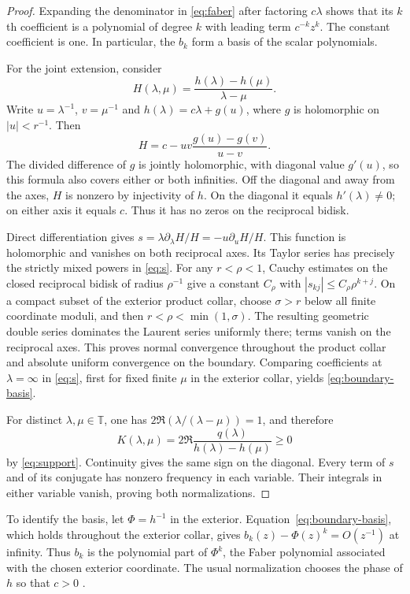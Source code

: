\documentclass[11pt]{article}
\newcommand{\T}{\mathbb T}
\theoremstyle{remark}\newtheorem{remark}[theorem]{Remark}
\numberwithin{equation}{section}
\begin{document}
\begin{proof}
Expanding the denominator in \eqref{eq:faber} after factoring $c\lambda$ shows that its $k$th coefficient is a polynomial of degree $k$ with leading term $c^{-k}z^k$. The constant coefficient is one. In particular, the $b_k$ form a basis of the scalar polynomials.

For the joint extension, consider
\[
 H(\lambda,\mu)=\frac{h(\lambda)-h(\mu)}{\lambda-\mu}.
\]
Write $u=\lambda^{-1}$, $v=\mu^{-1}$ and $h(\lambda)=c\lambda+g(u)$, where $g$ is holomorphic on $|u|<r^{-1}$. Then
\begin{equation}\label{eq:H}
 H=c-uv\frac{g(u)-g(v)}{u-v}.
\end{equation}
The divided difference of $g$ is jointly holomorphic, with diagonal value $g'(u)$, so this formula also covers either or both infinities. Off the diagonal and away from the axes, $H$ is nonzero by injectivity of $h$. On the diagonal it equals $h'(\lambda)\ne0$; on either axis it equals $c$. Thus it has no zeros on the reciprocal bidisk.

Direct differentiation gives $s=\lambda\partial_\lambda H/H=-u\partial_uH/H$. This function is holomorphic and vanishes on both reciprocal axes. Its Taylor series has precisely the strictly mixed powers in \eqref{eq:s}. For any $r<\rho<1$, Cauchy estimates on the closed reciprocal bidisk
of radius $\rho^{-1}$ give a constant $C_\rho$ with
$|s_{kj}|\le C_\rho\rho^{k+j}$. On a compact subset of the exterior
product collar, choose $\sigma>r$ below all finite coordinate moduli,
and then $r<\rho<\min(1,\sigma)$. The resulting geometric double
series dominates the Laurent series uniformly there; terms vanish on
the reciprocal axes. This proves normal convergence throughout the
product collar and absolute uniform convergence on the boundary. Comparing coefficients at $\lambda=\infty$ in \eqref{eq:s}, first for fixed finite $\mu$ in the exterior collar, yields \eqref{eq:boundary-basis}.

For distinct $\lambda,\mu\in\T$, one has $2\Re(\lambda/(\lambda-\mu))=1$, and therefore
\[
 K(\lambda,\mu)=2\Re\frac{q(\lambda)}{h(\lambda)-h(\mu)}\ge0
\]
by \eqref{eq:support}. Continuity gives the same sign on the diagonal. Every term of $s$ and of its conjugate has nonzero frequency in each variable. Their integrals in either variable vanish, proving both normalizations.
\end{proof}

To identify the basis, let $\Phi=h^{-1}$ in the exterior. Equation~\eqref{eq:boundary-basis}, which holds throughout the exterior collar, gives $b_k(z)-\Phi(z)^k=O(z^{-1})$ at infinity. Thus $b_k$ is the polynomial part of $\Phi^k$, the Faber polynomial associated with the chosen exterior coordinate. The usual normalization chooses the phase of $h$ so that $c>0$ \cite{Beckermann2005,BeckermannCrouzeix2014}.
\end{document}
